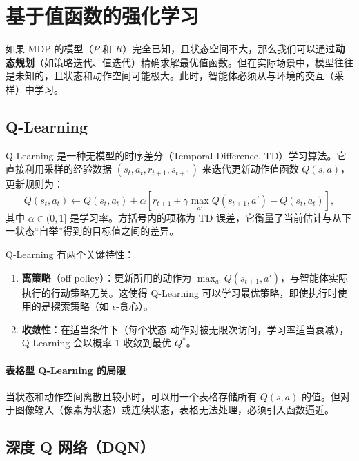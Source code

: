 \section{基于值函数的强化学习}

如果 MDP 的模型（$P$ 和 $R$）完全已知，且状态空间不大，那么我们可以通过\textbf{动态规划}（如策略迭代、值迭代）精确求解最优值函数。但在实际场景中，模型往往是未知的，且状态和动作空间可能极大。此时，智能体必须从与环境的交互（采样）中学习。

\subsection{Q-Learning}

Q-Learning 是一种无模型的时序差分（Temporal Difference, TD）学习算法\cite{WatkinsDayan1992qlearning}。它直接利用采样的经验数据 $(s_t, a_t, r_{t+1}, s_{t+1})$ 来迭代更新动作值函数 $Q(s,a)$，更新规则为：
\begin{equation}\label{eq:q_learning}
Q(s_t, a_t) \leftarrow Q(s_t, a_t) + \alpha \left[ r_{t+1} + \gamma \max_{a'} Q(s_{t+1}, a') - Q(s_t, a_t) \right],
\end{equation}
其中 $\alpha \in (0,1]$ 是学习率。方括号内的项称为 TD 误差，它衡量了当前估计与从下一状态“自举”得到的目标值之间的差异。

Q-Learning 有两个关键特性：
\begin{enumerate}
\item \textbf{离策略}（off-policy）：更新所用的动作为 $\max_{a'} Q(s_{t+1}, a')$，与智能体实际执行的行动策略无关。这使得 Q-Learning 可以学习最优策略，即使执行时使用的是探索策略（如 $\epsilon$-贪心）。
\item \textbf{收敛性}：在适当条件下（每个状态-动作对被无限次访问，学习率适当衰减），Q-Learning 会以概率 $1$ 收敛到最优 $Q^*$\cite{WatkinsDayan1992qlearning}。
\end{enumerate}

\paragraph{表格型 Q-Learning 的局限}

当状态和动作空间离散且较小时，可以用一个表格存储所有 $Q(s,a)$ 的值。但对于图像输入（像素为状态）或连续状态，表格无法处理，必须引入函数逼近。

\subsection{深度 Q 网络（DQN）}

